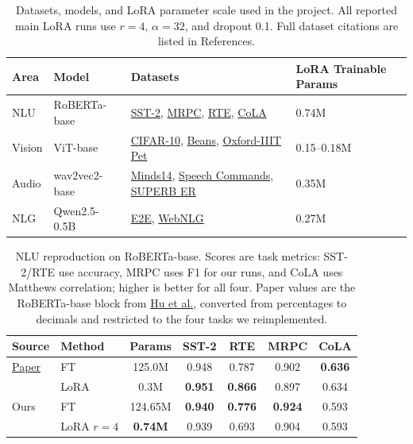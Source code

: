 \documentclass[11pt]{article}
\begin{document}
\begin{table}[h]
\centering
\small
\begin{tabular}{llll}
\toprule
Area & Model & Datasets & LoRA Trainable Params \\
\midrule
NLU & RoBERTa-base & \hyperref[ref:sst2]{SST-2}, \hyperref[ref:mrpc]{MRPC}, \hyperref[ref:rte]{RTE}, \hyperref[ref:cola]{CoLA} & 0.74M \\
Vision & ViT-base & \hyperref[ref:cifar10]{CIFAR-10}, \hyperref[ref:beans]{Beans}, \hyperref[ref:oxfordpet]{Oxford-IIIT Pet} & 0.15--0.18M \\
Audio & wav2vec2-base & \hyperref[ref:minds14]{Minds14}, \hyperref[ref:speechcommands]{Speech Commands}, \hyperref[ref:superb]{SUPERB ER} & 0.35M \\
NLG & Qwen2.5-0.5B & \hyperref[ref:e2e]{E2E}, \hyperref[ref:webnlg]{WebNLG} & 0.27M \\
\bottomrule
\end{tabular}
\caption{Datasets, models, and LoRA parameter scale used in the project. All reported main LoRA runs use $r=4$, $\alpha=32$, and dropout 0.1. Full dataset citations are listed in References.}
\label{tab:dataset-summary}
\end{table}

\begin{table}[h]
\centering
\small
\begin{tabular}{llccccc}
\toprule
Source & Method & Params & SST-2 & RTE & MRPC & CoLA \\
\midrule
\hyperref[ref:lora]{Paper} & FT & 125.0M & 0.948 & 0.787 & 0.902 & \textbf{0.636} \\
 & LoRA & 0.3M & \textbf{0.951} & \textbf{0.866} & 0.897 & 0.634 \\
\midrule
Ours & FT & 124.65M & \textbf{0.940} & \textbf{0.776} & \textbf{0.924} & 0.593 \\
 & LoRA $r=4$ & \textbf{0.74M} & 0.939 & 0.693 & 0.904 & 0.593 \\
\bottomrule
\end{tabular}
\caption{NLU reproduction on RoBERTa-base. Scores are task metrics: SST-2/RTE use accuracy, MRPC uses F1 for our runs, and CoLA uses Matthews correlation; higher is better for all four. Paper values are the RoBERTa-base block from \hyperref[ref:lora]{Hu et al.}, converted from percentages to decimals and restricted to the four tasks we reimplemented.}
\label{tab:nlu-repro}
\end{table}
\end{document}
